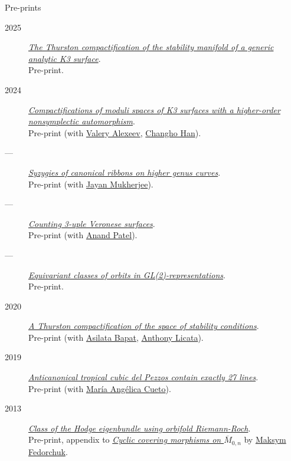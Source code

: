 \documentclass[11pt]{article}
\begin{document}
\begin{description}
\item[{Pre-prints}] 
\end{description}
\label{orge2c8e5e}
\begin{description}
\item[{2025}] \emph{\href{papers/CompStabGenK3.pdf}{The Thurston compactification of the stability manifold of a generic analytic K3 surface}}.\\
Pre-print.
\item[{2024}] \emph{\href{papers/k3z3.pdf}{Compactifications of moduli spaces of K3 surfaces with a higher-order nonsymplectic automorphism}}.\\
Pre-print (with \href{https://www.math.uga.edu/directory/people/valery-alexeev}{Valery Alexeev}, \href{https://sites.google.com/view/changho-han/}{Changho Han}).
\item[{---}] \emph{\href{papers/highergenusribbons.pdf}{Syzygies of canonical ribbons on higher genus curves}}.\\
Pre-print (with \href{https://sites.google.com/view/mukherjeejayan}{Jayan Mukherjee}).
\item[{---}] \emph{\href{papers/3veroneseP2.pdf}{Counting 3-uple Veronese surfaces}}.\\
Pre-print (with \href{https://sites.google.com/view/anand-patel}{Anand Patel}).
\item[{---}] \emph{\href{papers/gl2orbits.pdf}{Equivariant classes of orbits in GL(2)-representations}}.\\
Pre-print.
\item[{2020}] \emph{\href{papers/a2-compactification.pdf}{A Thurston compactification of the space of stability conditions}}.\\
Pre-print (with \href{https://asilata.org/}{Asilata Bapat}, \href{https://maths-people.anu.edu.au/\~licatat/}{Anthony Licata}).
\item[{2019}] \emph{\href{papers/lines\_on\_tropical\_cubics.pdf}{Anticanonical tropical cubic del Pezzos contain exactly 27 lines}}.\\
Pre-print (with \href{https://people.math.osu.edu/cueto.5/}{María Angélica Cueto}).
\item[{2013}] \emph{\href{papers/CyclicAppendix.pdf}{Class of the Hodge eigenbundle using orbifold Riemann-Roch}}.\\
Pre-print, appendix to \href{https://drive.google.com/file/d/1wq-Fh3DiqODc51t-J0phIexVF7B4lxsY/view}{\emph{Cyclic covering morphisms on \(\overline M_{0,n}\)}} by \href{https://www2.bc.edu/maksym-fedorchuk/}{Maksym Fedorchuk}.
\end{description}
\end{document}
